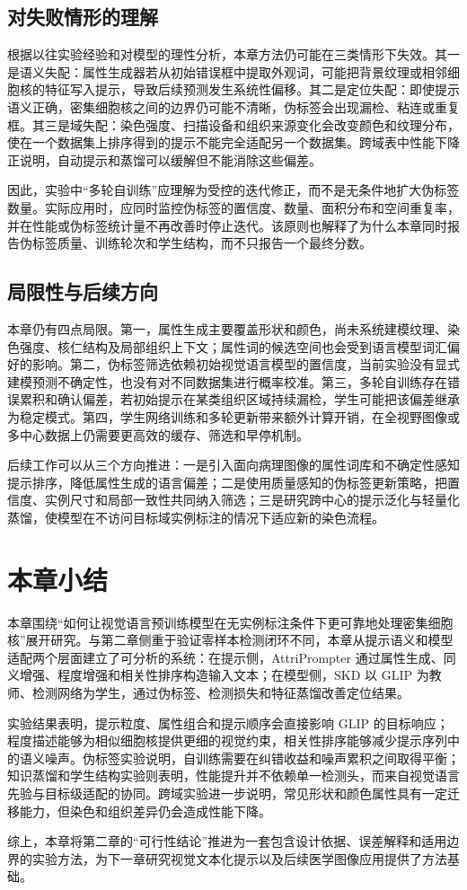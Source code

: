 \subsection{对失败情形的理解}

根据以往实验经验和对模型的理性分析，本章方法仍可能在三类情形下失效。其一是语义失配：属性生成器若从初始错误框中提取外观词，可能把背景纹理或相邻细胞核的特征写入提示，导致后续预测发生系统性偏移。其二是定位失配：即使提示语义正确，密集细胞核之间的边界仍可能不清晰，伪标签会出现漏检、粘连或重复框。其三是域失配：染色强度、扫描设备和组织来源变化会改变颜色和纹理分布，使在一个数据集上排序得到的提示不能完全适配另一个数据集。跨域表中性能下降正说明，自动提示和蒸馏可以缓解但不能消除这些偏差。

因此，实验中“多轮自训练”应理解为受控的迭代修正，而不是无条件地扩大伪标签数量。实际应用时，应同时监控伪标签的置信度、数量、面积分布和空间重复率，并在性能或伪标签统计量不再改善时停止迭代。该原则也解释了为什么本章同时报告伪标签质量、训练轮次和学生结构，而不只报告一个最终分数。

\subsection{局限性与后续方向}

本章仍有四点局限。第一，属性生成主要覆盖形状和颜色，尚未系统建模纹理、染色强度、核仁结构及局部组织上下文；属性词的候选空间也会受到语言模型词汇偏好的影响。第二，伪标签筛选依赖初始视觉语言模型的置信度，当前实验没有显式建模预测不确定性，也没有对不同数据集进行概率校准。第三，多轮自训练存在错误累积和确认偏差，若初始提示在某类组织区域持续漏检，学生可能把该偏差继承为稳定模式。第四，学生网络训练和多轮更新带来额外计算开销，在全视野图像或多中心数据上仍需要更高效的缓存、筛选和早停机制。

后续工作可以从三个方向推进：一是引入面向病理图像的属性词库和不确定性感知提示排序，降低属性生成的语言偏差；二是使用质量感知的伪标签更新策略，把置信度、实例尺寸和局部一致性共同纳入筛选；三是研究跨中心的提示泛化与轻量化蒸馏，使模型在不访问目标域实例标注的情况下适应新的染色流程。

\section{本章小结}

本章围绕“如何让视觉语言预训练模型在无实例标注条件下更可靠地处理密集细胞核”展开研究。与第二章侧重于验证零样本检测闭环不同，本章从提示语义和模型适配两个层面建立了可分析的系统：在提示侧，AttriPrompter 通过属性生成、同义增强、程度增强和相关性排序构造输入文本；在模型侧，SKD 以 GLIP 为教师、检测网络为学生，通过伪标签、检测损失和特征蒸馏改善定位结果。

实验结果表明，提示粒度、属性组合和提示顺序会直接影响 GLIP 的目标响应；程度描述能够为相似细胞核提供更细的视觉约束，相关性排序能够减少提示序列中的语义噪声。伪标签实验说明，自训练需要在纠错收益和噪声累积之间取得平衡；知识蒸馏和学生结构实验则表明，性能提升并不依赖单一检测头，而来自视觉语言先验与目标级适配的协同。跨域实验进一步说明，常见形状和颜色属性具有一定迁移能力，但染色和组织差异仍会造成性能下降。

综上，本章将第二章的“可行性结论”推进为一套包含设计依据、误差解释和适用边界的实验方法，为下一章研究视觉文本化提示以及后续医学图像应用提供了方法基础。
